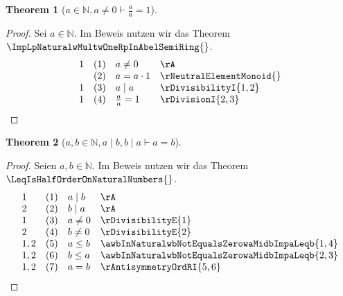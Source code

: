 \documentclass{book}
\theoremstyle{plain}
\newtheorem{theorem}{Theorem}
\theoremstyle{remark}
\theoremstyle{definition}
\begin{document}
\label{aInNaturalwaNotEqualsZeroImpLpaRpDurchLpaRpEqualsOne}
\begin{theorem}[\(a\in\mathbb{N}, a\neq 0 \vdash \frac{a}{a}=1\)]
\end{theorem}
\begin{proof}
Sei \(a\in\mathbb{N}\).
Im Beweis nutzen wir das Theorem \(\ImpLpNaturalwMultwOneRpInAbelSemiRing{}\). 
    \[
	\begin{array}{llclll}
    1       &  (1)  & \multicolumn{3}{l}{a\neq 0} & \rA \\
            &  (2)  & \multicolumn{3}{l}{a=a\cdot 1} & \rNeutralElementMonoid{} \\
    1       &  (3)  & \multicolumn{3}{l}{a\mid a} & \rDivisibilityI{1,2} \\
    1       &  (4)  & \multicolumn{3}{l}{\frac{a}{a}=1} & \rDivisionI{2,3} \\
    \end{array}
	\]
\end{proof}


\label{awbInNaturalwaMidbwbMidaImpaEqualsb}
\begin{theorem}[\(a,b\in\mathbb{N}, a\mid b, b\mid a \vdash a=b\)]
\end{theorem}
\begin{proof}
Seien \(a,b\in\mathbb{N}\).
Im Beweis nutzen wir das Theorem \(\LeqIsHalfOrderOnNaturalNumbers{}\). 
    \[
	\begin{array}{llclll}
    1       &  (1)  & \multicolumn{3}{l}{a\mid b} & \rA \\
    2       &  (2)  & \multicolumn{3}{l}{b\mid a} & \rA \\
    1       &  (3)  & \multicolumn{3}{l}{a\neq 0} & \rDivisibilityE{1} \\
    2       &  (4)  & \multicolumn{3}{l}{b\neq 0} & \rDivisibilityE{2} \\
    1,2       &  (5)  & \multicolumn{3}{l}{a\leq b} & \awbInNaturalwbNotEqualsZerowaMidbImpaLeqb{1,4} \\
    1,2       &  (6)  & \multicolumn{3}{l}{b\leq a} & \awbInNaturalwbNotEqualsZerowaMidbImpaLeqb{2,3} \\
    1,2       &  (7)  & \multicolumn{3}{l}{a=b} & \rAntisymmetryOrdRI{5,6} \\
    \end{array}
	\]
\end{proof}
\end{document}
